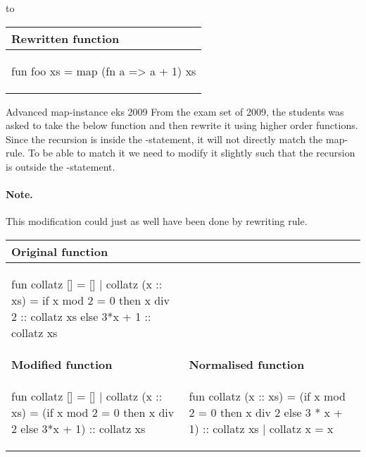 \begin{example}
\noindent
to

\begin{center}
  \begin{tabular}{|l|}
    \hline
    \textbf{Rewritten function} \\ \hline
  \begin{sml}
fun foo xs = map (fn a => a + 1) xs
  \end{sml} \\ \hline
\end{tabular}

\end{center}

\end{example}

\begin{example}{Advanced \textsf{map}-instance}
  eks 2009
  From the exam set of 2009, the students was asked to take the below
  function and then rewrite it using higher order functions. Since the recursion
  is inside the -statement, it will not directly match the
  \textsf{map}-rule. To be able to match it we need to modify it slightly such
  that the recursion is outside the -statement. 

  \paragraph{Note.} This modification could just as well have been done by
  rewriting rule. 


  \begin{center}
    \begin{tabular}{|l|l|}
      \hline
      \textbf{Original function} 
      & 
      \\ \hline
      \begin{sml}
fun collatz [] = []
  | collatz (x :: xs) = 
      if x mod 2 = 0 then 
        x div 2 :: collatz xs
      else 
        3*x + 1 :: collatz xs
      \end{sml}  
      & 
      \\ \hline
      \textbf{Modified function} 
      &
      \textbf{Normalised function}
      \\ \hline
      \begin{sml}
fun collatz [] = []
  | collatz (x :: xs) = 
      (if x mod 2 = 0 then 
       x div 2 else 3*x + 1)
      :: collatz xs        
      \end{sml}
      &
      \begin{sml}
fun collatz (x :: xs) = 
    (if x mod 2 = 0 then
     x div 2 else 3 * x + 1) 
     :: collatz xs
  | collatz x = x        
      \end{sml}
    \end{tabular}
  \end{center}
  


\noindent


\end{example}

